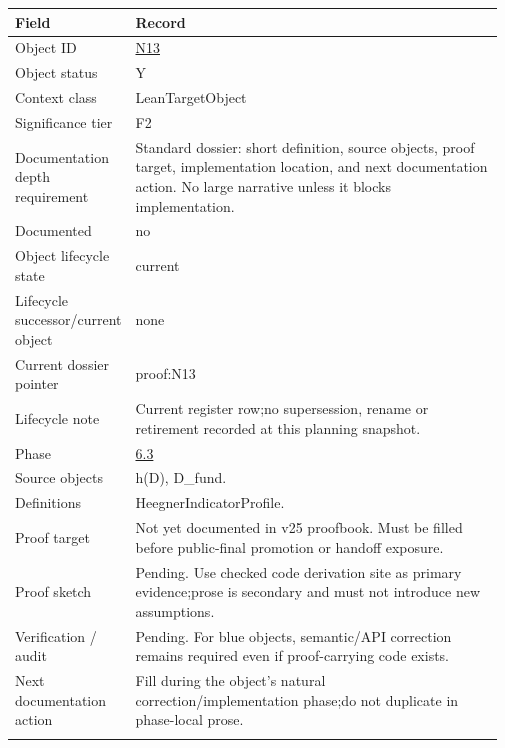 \begin{longtable}{L{0.16\linewidth} L{0.81\linewidth}}
\hline
\textbf{Field} & \textbf{Record}\\
\hline
Object ID & \hyperlink{object-row-N13}{N13}\\
\hline\addlinespace[0.20em]
Object status & Y\\
\hline\addlinespace[0.20em]
Context class & LeanTargetObject\\
\hline\addlinespace[0.20em]
Significance tier & F2\\
\hline\addlinespace[0.20em]
Documentation depth requirement & Standard dossier: short definition, source objects, proof target, implementation location, and next documentation action. No large narrative unless it blocks implementation.\\
\hline\addlinespace[0.20em]
Documented & no\\
\hline\addlinespace[0.20em]
Object lifecycle state & current\\
\hline\addlinespace[0.20em]
Lifecycle successor/\allowbreak{}current object & none\\
\hline\addlinespace[0.20em]
Current dossier pointer & proof:N13\\
\hline\addlinespace[0.20em]
Lifecycle note & Current register row;\newline no supersession, rename or retirement recorded at this planning snapshot.\\
\hline\addlinespace[0.20em]
Phase & \hyperlink{phase-row-6-3}{6.3}\\
\hline\addlinespace[0.20em]
Source objects & h(D), D\_fund.\\
\hline\addlinespace[0.20em]
Definitions & HeegnerIndicatorProfile.\\
\hline\addlinespace[0.20em]
Proof target & Not yet documented in v25 proofbook. Must be filled before public-final promotion or handoff exposure.\\
\hline\addlinespace[0.20em]
Proof sketch & Pending. Use checked code derivation site as primary evidence;\newline prose is secondary and must not introduce new assumptions.\\
\hline\addlinespace[0.20em]
Verification /\allowbreak{} audit & Pending. For blue objects, semantic/\allowbreak{}API correction remains required even if proof-carrying code exists.\\
\hline\addlinespace[0.20em]
Next documentation action & Fill during the object's natural correction/\allowbreak{}implementation phase;\newline do not duplicate in phase-local prose.\\
\hline\addlinespace[0.20em]
\end{longtable}
